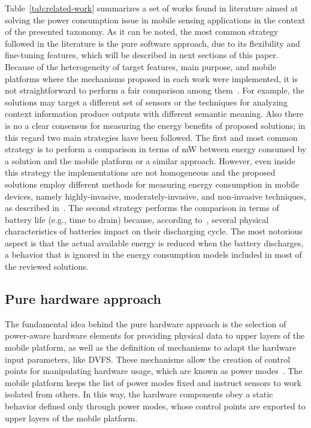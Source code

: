 \documentclass[ENG,PhD]{cinvestav}
\begin{document}
Table~\ref{tab:related-work} summarizes a set of works found in literature aimed at solving the power consumption issue in mobile sensing applications in the context of the presented taxonomy.
As it can be noted, the most common strategy followed in the literature is the pure software approach, due to its flexibility and fine-tuning features, which will be described in next sections of this paper.
Because of the heterogeneity of target features, main purpose, and mobile platforms where the mechanisms proposed in each work were implemented, it is not straightforward to perform a fair comparison among them~\cite{Vallina-Rodriguez2013,Neely2008}.
For example, the solutions may target a different set of sensors or the techniques for analyzing context information produce outputs with different semantic meaning.
Also there is no a clear consensus for measuring the energy benefits of proposed solutions; in this regard two main strategies have been followed.
The first and most common strategy is to perform a comparison in terms of mW between energy consumed by a solution and the mobile platform or a similar approach. 
However, even inside this strategy the implementations are not homogeneous and the proposed solutions employ different methods for measuring energy consumption in mobile devices, namely highly-invasive, moderately-invasive, and non-invasive techniques, as described in~\cite{Abreu2012}.
The second strategy performs the comparison in terms of battery life (e.g., time to drain) because, according to~\cite{Kim2014}, several physical characteristics of batteries impact on their discharging cycle.
The most notorious aspect is that the actual available energy is reduced when the battery discharges, a behavior that is ignored in the energy consumption models included in most of the reviewed solutions.


\subsection{Pure hardware approach}
The fundamental idea behind the pure hardware approach is the selection of power-aware hardware elements for providing physical data to upper layers of the mobile platform, as well as the definition of mechanisms to adapt the hardware input parameters, like DVFS.
These mechanisms allow the creation of control points for manipulating hardware usage, which are known as power modes~\cite{Ranganathan2010,Lorch1998,Benini2000}.
The mobile platform keeps the list of power modes fixed and instruct sensors to work isolated from others.
In this way, the hardware components obey a static behavior defined only through power modes, whose control points are exported to upper layers of the mobile platform.
\end{document}
